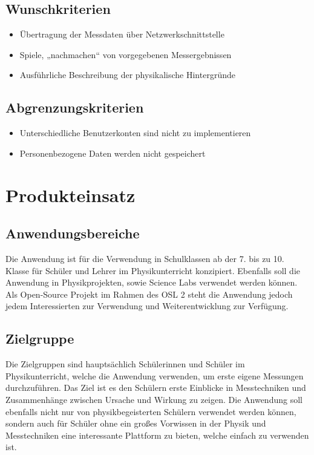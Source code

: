 \documentclass[parskip=full]{scrartcl}
\begin{document}
\subsection{Wunschkriterien}

\begin{itemize}

\item Übertragung der Messdaten über Netzwerkschnittstelle
\item Spiele, „nachmachen“ von vorgegebenen Messergebnissen
\item Ausführliche Beschreibung der physikalische Hintergründe

 \end{itemize}

\subsection{Abgrenzungskriterien}

\begin{itemize}

\item Unterschiedliche Benutzerkonten sind nicht zu implementieren
\item Personenbezogene Daten werden nicht gespeichert

 \end{itemize}

\section{Produkteinsatz}\label{produkteinsatz}

\subsection{Anwendungsbereiche}

Die Anwendung ist für die Verwendung in Schulklassen ab der 7. bis zu 10. Klasse für Schüler und Lehrer im Physikunterricht konzipiert. Ebenfalls soll die Anwendung in Physikprojekten, sowie \gls{Science Labs} verwendet werden können. 
Als \gls{Open-Source Projekt} im Rahmen des \gls{OSL 2} steht die Anwendung jedoch jedem Interessierten zur Verwendung und Weiterentwicklung zur Verfügung.


\subsection{Zielgruppe}

Die Zielgruppen sind hauptsächlich Schülerinnen und Schüler im Physikunterricht, welche die Anwendung verwenden, um erste eigene Messungen durchzuführen. Das Ziel ist es den Schülern erste Einblicke in Messtechniken und Zusammenhänge zwischen Ursache und Wirkung zu zeigen. 
Die Anwendung soll ebenfalls nicht nur von physikbegeisterten Schülern verwendet werden können, sondern auch für Schüler ohne ein großes Vorwissen in der Physik und Messtechniken eine interessante Plattform zu bieten, welche einfach zu verwenden ist.
\end{document}
